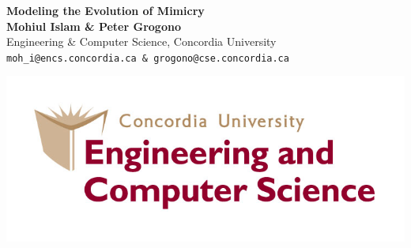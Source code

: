 \documentclass[a0,portrait]{a0poster}
\begin{document}

\begin{minipage}[b]{0.85\linewidth}
\veryHuge \color{NavyBlue} \textbf{Modeling the Evolution of Mimicry} \color{Black}\\[0.5cm] %
\huge \textbf{Mohiul Islam \& Peter Grogono}\\[0.5cm] %
\huge Engineering \& Computer Science, Concordia University\\[0.5cm] %
\large \texttt{moh\_i@encs.concordia.ca \& grogono@cse.concordia.ca}\\
\end{minipage}
%
\begin{minipage}[b]{0.19\linewidth}
\includegraphics[width=20cm]{logo.jpg} %
\end{minipage}

\vspace{1cm} %

\end{document}
